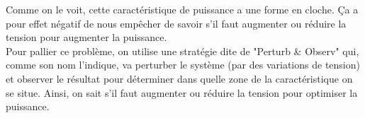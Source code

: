Comme on le voit, cette caractéristique de puissance a une forme en cloche. Ça a pour effet négatif de nous empêcher de savoir s'il faut augmenter ou réduire la tension pour augmenter la puissance.\\
Pour pallier ce problème, on utilise une stratégie dite de "Perturb \& Observ" qui, comme son nom l'indique, va perturber le système (par des variations de tension) et observer le résultat pour déterminer dans quelle zone de la caractéristique on se situe. Ainsi, on sait s'il faut augmenter ou réduire la tension pour optimiser la puissance.\\

